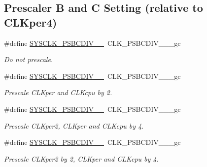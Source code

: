 \subsection*{Prescaler B and C Setting (relative to C\-L\-Kper4)}
\begin{DoxyCompactItemize}
\item 
\hypertarget{group__sysclk__group_gaebcff7ccf9f9c8294c7859166e574a34}{\#define \hyperlink{group__sysclk__group_gaebcff7ccf9f9c8294c7859166e574a34}{S\-Y\-S\-C\-L\-K\-\_\-\-P\-S\-B\-C\-D\-I\-V\-\_\-\_}~C\-L\-K\-\_\-\-P\-S\-B\-C\-D\-I\-V\-\_\-\_\-\_\-gc}\label{group__sysclk__group_gaebcff7ccf9f9c8294c7859166e574a34}

\begin{DoxyCompactList}\small\item\em Do not prescale. \end{DoxyCompactList}\item 
\hypertarget{group__sysclk__group_ga7b696388bc190bd206159796fe0c8eeb}{\#define \hyperlink{group__sysclk__group_ga7b696388bc190bd206159796fe0c8eeb}{S\-Y\-S\-C\-L\-K\-\_\-\-P\-S\-B\-C\-D\-I\-V\-\_\-\_}~C\-L\-K\-\_\-\-P\-S\-B\-C\-D\-I\-V\-\_\-\_\-\_\-gc}\label{group__sysclk__group_ga7b696388bc190bd206159796fe0c8eeb}

\begin{DoxyCompactList}\small\item\em Prescale C\-L\-Kper and C\-L\-Kcpu by 2. \end{DoxyCompactList}\item 
\hypertarget{group__sysclk__group_gab0810cd332a616817a9e7b78c2cf6dd1}{\#define \hyperlink{group__sysclk__group_gab0810cd332a616817a9e7b78c2cf6dd1}{S\-Y\-S\-C\-L\-K\-\_\-\-P\-S\-B\-C\-D\-I\-V\-\_\-\_}~C\-L\-K\-\_\-\-P\-S\-B\-C\-D\-I\-V\-\_\-\_\-\_\-gc}\label{group__sysclk__group_gab0810cd332a616817a9e7b78c2cf6dd1}

\begin{DoxyCompactList}\small\item\em Prescale C\-L\-Kper2, C\-L\-Kper and C\-L\-Kcpu by 4. \end{DoxyCompactList}\item 
\hypertarget{group__sysclk__group_ga35a93bb11c0b72203a45d88761207cff}{\#define \hyperlink{group__sysclk__group_ga35a93bb11c0b72203a45d88761207cff}{S\-Y\-S\-C\-L\-K\-\_\-\-P\-S\-B\-C\-D\-I\-V\-\_\-\_}~C\-L\-K\-\_\-\-P\-S\-B\-C\-D\-I\-V\-\_\-\_\-\_\-gc}\label{group__sysclk__group_ga35a93bb11c0b72203a45d88761207cff}

\begin{DoxyCompactList}\small\item\em Prescale C\-L\-Kper2 by 2, C\-L\-Kper and C\-L\-Kcpu by 4. \end{DoxyCompactList}\end{DoxyCompactItemize}

